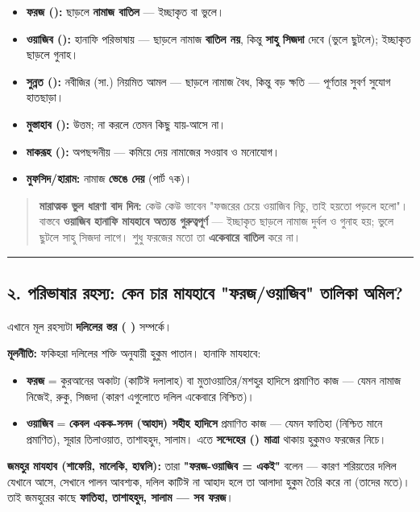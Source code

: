 \begin{itemize}
\item \textbf{ফরজ ():} ছাড়লে \textbf{নামাজ বাতিল} — ইচ্ছাকৃত বা ভুলে।
\item \textbf{ওয়াজিব ():} হানাফি পরিভাষায় — ছাড়লে নামাজ \textbf{বাতিল নয়}, কিন্তু \textbf{সাহু সিজদা} দেবে (ভুলে ছুটলে); ইচ্ছাকৃত ছাড়লে গুনাহ।
\item \textbf{সুন্নত ():} নবীজির (সা.) নিয়মিত আমল — ছাড়লে নামাজ বৈধ, কিন্তু বড় ক্ষতি — পূর্ণতার সুবর্ণ সুযোগ হাতছাড়া।
\item \textbf{মুস্তাহাব ():} উত্তম; না করলে তেমন কিছু যায়-আসে না।
\item \textbf{মাকরূহ ():} অপছন্দনীয় — কমিয়ে দেয় নামাজের সওয়াব ও মনোযোগ।
\item \textbf{মুফসিদ/হারাম:} নামাজ \textbf{ভেঙে দেয়} (পার্ট ৭ক)।
\end{itemize}
\begin{quote}
\textbf{মারাত্মক ভুল ধারণা বাদ দিন:} কেউ কেউ ভাবেন "ফজরের চেয়ে ওয়াজিব নিচু, তাই হয়তো পড়লে হলো"। বাস্তবে \textbf{ওয়াজিব হানাফি মাযহাবে অত্যন্ত গুরুত্বপূর্ণ} — ইচ্ছাকৃত ছাড়লে নামাজ দুর্বল ও গুনাহ হয়; ভুলে ছুটলে সাহু সিজদা লাগে। শুধু ফরজের মতো তা \textbf{একেবারে বাতিল} করে না।
\end{quote}

\medskip\hrule\medskip

\subsection*{২. পরিভাষার রহস্য: কেন চার মাযহাবে "ফরজ/ওয়াজিব" তালিকা অমিল?}

এখানে মূল রহস্যটা \textbf{দলিলের স্তর (  )} সম্পর্কে।

\textbf{মূলনীতি:} ফকিহরা দলিলের শক্তি অনুযায়ী হুকুম পাতান। হানাফি মাযহাবে:
\begin{itemize}
\item \textbf{ফরজ} = কুরআনের অকাট্য (কাটিঈ দলালাহ) বা মুতাওয়াতির/মশহুর হাদিসে প্রমাণিত কাজ — যেমন নামাজ নিজেই, রুকু, সিজদা (কারণ এগুলোতে দলিল একেবারে নিশ্চিত)।
\item \textbf{ওয়াজিব} = \textbf{কেবল একক-সনদ (আহাদ) সহীহ হাদিসে} প্রমাণিত কাজ — যেমন ফাতিহা (নিশ্চিত মানে প্রমাণিত), সূরার তিলাওয়াত, তাশাহহুদ, সালাম। এতে \textbf{সন্দেহের () মাত্রা} থাকায় হুকুমও ফরজের নিচে।
\end{itemize}
\textbf{জমহুর মাযহাব (শাফেয়ি, মালেকি, হাম্বলি):} তারা \textbf{"ফরজ-ওয়াজিব = একই"} বলেন — কারণ শরিয়তের দলিল যেখানে আসে, সেখানে পালন আবশ্যক, দলিল কাটিঈ না আহাদ হলে তা আলাদা হুকুম তৈরি করে না (তাদের মতে)। তাই জমহুরের কাছে \textbf{ফাতিহা, তাশাহহুদ, সালাম — সব ফরজ}।

